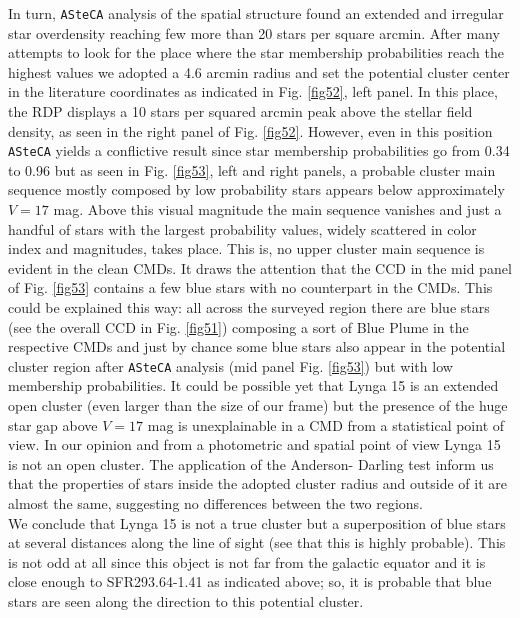 \documentclass{aa}
\begin{document}
In turn, \texttt{ASteCA} analysis of the spatial structure found an extended and
irregular star overdensity reaching few more than 20 stars per square arcmin.
After many attempts to look for the place where the star membership
probabilities reach the highest values we adopted a 4.6 arcmin radius and set
the potential cluster center in the literature coordinates as indicated in Fig.
\ref{fig52}, left panel. In this place, the RDP displays a 10 stars per squared
arcmin peak above the stellar field density, as seen in the right panel of Fig. 
\ref{fig52}. However, even in this position \texttt{ASteCA} yields a
conflictive result since star membership
probabilities go from 0.34 to 0.96 but as seen in Fig. \ref{fig53}, left and
right panels, a probable cluster main sequence mostly composed by low
probability stars appears below approximately $V = 17$ mag. Above this visual
magnitude the main sequence vanishes and just a handful of stars with the
largest probability values, widely scattered in color index and magnitudes,
takes place. This is, no upper cluster main sequence is evident in the clean
CMDs. It draws the attention that the CCD in the mid panel of Fig. \ref{fig53}
contains a few blue stars with no counterpart in the CMDs. This could be
explained this way: all across the surveyed region there are blue stars (see the
overall CCD in Fig. \ref{fig51}) composing a sort of Blue Plume in the
respective CMDs and just by chance some blue stars also appear in the potential
cluster region after \texttt{ASteCA} analysis (mid panel Fig. \ref{fig53}) but
with low membership probabilities. It could be possible yet that Lynga 15 is an
extended open cluster (even larger than the size of our frame) but the presence
of the huge star gap above $V=17$ mag is unexplainable in a CMD from a
statistical point of view. In our opinion and from a photometric and spatial
point of view Lynga 15 is not an open cluster. The application of the Anderson-
Darling test inform us that the properties of stars inside the adopted cluster
radius and outside of it are almost the same, suggesting no differences between
the two regions.\\

We conclude that Lynga 15 is not a true cluster but a superposition of blue
stars at several distances along the line of sight (see that this is highly
probable). This is not odd at all since this object is not
far from the galactic equator and it is close enough to SFR293.64-1.41 as
indicated above; so, it is probable that blue stars are seen along the direction
to this potential cluster.
\end{document}
